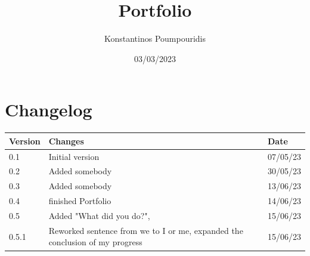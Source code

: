 \documentclass[12pt, letterpaper]{article}
\title{Portfolio}
\author{Konstantinos Poumpouridis}
\date{03/03/2023}
\begin{document}
\maketitle
\thispagestyle{empty}
\newpage
\section{Changelog}
    \begin{table}[htbp]
        \begin{tabular}{|l|l|l|}
            \hline
            Version & Changes         & Date   \tabularnewline \hline
            0.1     & Initial version & 07/05/23 \tabularnewline \hline
            0.2     & Added somebody & 30/05/23 \tabularnewline \hline
            0.3     & Added somebody & 13/06/23 \tabularnewline \hline
            0.4     & finished Portfolio & 14/06/23 \tabularnewline \hline
            0.5     & Added "What did you do?",  & 15/06/23 \tabularnewline \hline
            0.5.1     & Reworked sentence from we to I or me, expanded the conclusion of my progress & 15/06/23 \tabularnewline \hline
        \end{tabular}
    \end{table}
\newpage
\tableofcontents
\newpage
\end{document}
